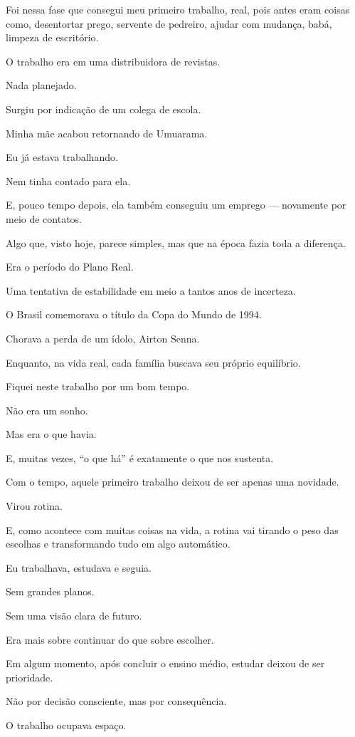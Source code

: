 Foi nessa fase que consegui meu primeiro trabalho, real, pois antes eram coisas como, desentortar prego, servente de pedreiro, ajudar com mudança, babá, limpeza de escritório.

O trabalho era em uma distribuidora de revistas.

Nada planejado. 

Surgiu por indicação de um colega de escola.

Minha mãe acabou retornando de Umuarama.

Eu já estava trabalhando. 

Nem tinha contado para ela.

E, pouco tempo depois, ela também conseguiu um emprego — novamente por meio de contatos. 

Algo que, visto hoje, parece simples, mas que na época fazia toda a diferença.

Era o período do Plano Real.

Uma tentativa de estabilidade em meio a tantos anos de incerteza.

O Brasil comemorava o título da Copa do Mundo de 1994.

Chorava a perda de um ídolo, Airton Senna. 

Enquanto, na vida real, cada família buscava seu próprio equilíbrio.

Fiquei neste trabalho por um bom tempo.

Não era um sonho.

Mas era o que havia.

E, muitas vezes, “o que há” é exatamente o que nos sustenta.

Com o tempo, aquele primeiro trabalho deixou de ser apenas uma novidade.

Virou rotina.

E, como acontece com muitas coisas na vida, a rotina vai tirando o peso das escolhas e transformando tudo em algo automático.

Eu trabalhava, estudava e seguia.

Sem grandes planos.

Sem uma visão clara de futuro.

Era mais sobre continuar do que sobre escolher.

Em algum momento, após concluir o ensino médio, estudar deixou de ser prioridade.

Não por decisão consciente, mas por consequência. 

O trabalho ocupava espaço. 

